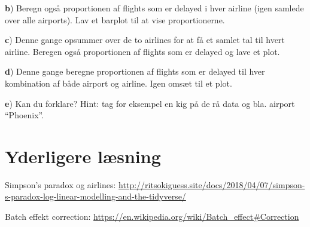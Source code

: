 \documentclass[
]{book}
\begin{document}
\textbf{b}) Beregn også proportionen af flights som er delayed i hver airline (igen samlede over alle airports). Lav et barplot til at vise proportionerne.

\textbf{c}) Denne gange opsummer over de to airlines for at få et samlet tal til hvert airline. Beregen også proportionen af flights som er delayed og lave et plot.

\textbf{d}) Denne gange beregne proportionen af flights som er delayed til hver kombination af både airport og airline. Igen omsæt til et plot.

\textbf{e}) Kan du forklare? Hint: tag for eksempel en kig på de rå data og bla. airport ``Phoenix''.

\hypertarget{yderligere-luxe6sning}{%
\section{Yderligere læsning}\label{yderligere-luxe6sning}}

Simpson's paradox og airlines: \url{http://ritsokiguess.site/docs/2018/04/07/simpson-s-paradox-log-linear-modelling-and-the-tidyverse/}

Batch effekt correction: \url{https://en.wikipedia.org/wiki/Batch_effect\#Correction}

  
\end{document}
